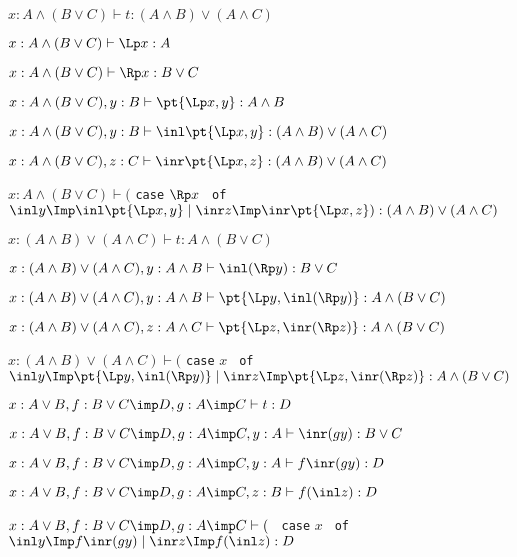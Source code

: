 \documentclass[11pt,letterpaper]{article}
\begin{document}
\item $x: A\land (B\lor C)\vdash t: (A\land B)\lor (A\land C)$
  \be
  \item $x: A\land (B\lor C)\vdash \Lp x: A$
    \item $x: A\land (B\lor C)\vdash \Rp x: B\lor C$
      \item $x: A\land (B\lor C), y:B \vdash \pt{\Lp x, y}:A\land B$
        \item $x: A\land (B\lor C), y:B \vdash \inl\pt{\Lp x, y}:(A\land
          B)\lor (A\land C)$
          \item $x: A\land (B\lor C), z:C \vdash \inr\pt{\Lp x, z}:(A\land
          B)\lor (A\land C)$
          \item $x: A\land (B\lor C)\vdash
               ($ {\tt case} $\Rp x$ {\tt
        of} $\inl y\Imp \inl \pt{\Lp x,y}\mid\inr z\Imp \inr\pt{\Lp x,z})
            :(A\land B)\lor (A\land C)$
          
  \ee


\item $x: (A\land B)\lor (A\land C)\vdash t: A\land (B\lor C)$
  \be
  \item $x: (A\land B)\lor (A\land C), y:A\land B\vdash \inl(\Rp
    y):B\lor C$
     \item $x: (A\land B)\lor (A\land C), y:A\land B\vdash \pt{\Lp y,\inl(\Rp
    y)}:A\land (B\lor C)$
     \item $x: (A\land B)\lor (A\land C), z:A\land C\vdash \pt{\Lp z,\inr(\Rp
    z)}:A\land (B\lor C)$
       \item $x: (A\land B)\lor (A\land C)\vdash
               ($ {\tt case} $x$ {\tt
        of} $\inl y\Imp \pt{\Lp y,\inl(\Rp
    y)}\mid\inr z\Imp \pt{\Lp z,\inr(\Rp
    z)}
            : A\land (B\lor C)$
  \ee
  

\item $x: A\lor B, f: B\lor C\imp D, g:A\imp C\vdash t:D$
  \be
  \item $x: A\lor B, f: B\lor C\imp D, g:A\imp C, y:A\vdash \inr (g
    y):B\lor C$
    \item $x: A\lor B, f: B\lor C\imp D, g:A\imp C, y:A\vdash f\inr (g
    y):D$
       \item $x: A\lor B, f: B\lor C\imp D, g:A\imp C, z:B\vdash
         f(\inl z):D$
               \item $x: A\lor B, f: B\lor C\imp D, g:A\imp C\vdash ($ {\tt 
case} $x$ {\tt
        of} $\inl y\Imp f\inr (gy)\mid\inr z\Imp f(\inl z):D$
  \ee
  
    
\end{document}
